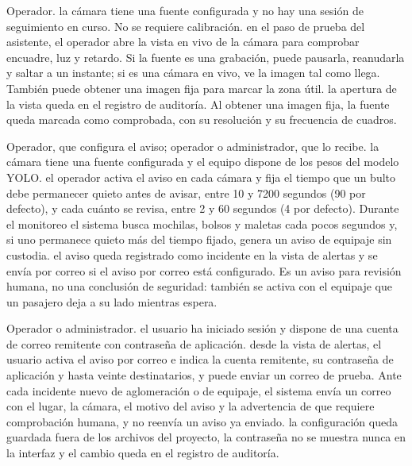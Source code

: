   {Operador.}
  {la cámara tiene una fuente configurada y no hay una sesión de
   seguimiento en curso. No se requiere calibración.}
  {en el paso de prueba del asistente, el operador abre la vista en vivo
   de la cámara para comprobar encuadre, luz y retardo. Si la fuente es una
   grabación, puede pausarla, reanudarla y saltar a un instante; si es una
   cámara en vivo, ve la imagen tal como llega. También puede obtener una
   imagen fija para marcar la zona útil.}
  {la apertura de la vista queda en el registro de auditoría. Al obtener
   una imagen fija, la fuente queda marcada como comprobada, con su
   resolución y su frecuencia de cuadros.}

  {Operador, que configura el aviso; operador o administrador, que lo
   recibe.}
  {la cámara tiene una fuente configurada y el equipo dispone de los pesos
   del modelo YOLO.}
  {el operador activa el aviso en cada cámara y fija el tiempo que un
   bulto debe permanecer quieto antes de avisar, entre 10 y 7200 segundos
   (90 por defecto), y cada cuánto se revisa, entre 2 y 60 segundos (4 por
   defecto). Durante el monitoreo el sistema busca mochilas, bolsos y
   maletas cada pocos segundos y, si uno permanece quieto más del tiempo
   fijado, genera un aviso de equipaje sin custodia.}
  {el aviso queda registrado como incidente en la vista de alertas y se
   envía por correo si el aviso por correo está configurado. Es un aviso
   para revisión humana, no una conclusión de seguridad: también se activa
   con el equipaje que un pasajero deja a su lado mientras espera.}

  {Operador o administrador.}
  {el usuario ha iniciado sesión y dispone de una cuenta de correo
   remitente con contraseña de aplicación.}
  {desde la vista de alertas, el usuario activa el aviso por correo e
   indica la cuenta remitente, su contraseña de aplicación y hasta veinte
   destinatarios, y puede enviar un correo de prueba. Ante cada incidente
   nuevo de aglomeración o de equipaje, el sistema envía un correo con el
   lugar, la cámara, el motivo del aviso y la advertencia de que requiere
   comprobación humana, y no reenvía un aviso ya enviado.}
  {la configuración queda guardada fuera de los archivos del proyecto, la
   contraseña no se muestra nunca en la interfaz y el cambio queda en el
   registro de auditoría.}

